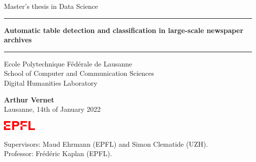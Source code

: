 \documentclass[11pt,preprint]{report}
\begin{document}
\begin{titlepage}
\begin{center}
\hspace{0cm}
\vspace{3cm}

\Large
Master's thesis in Data Science
\vspace{0.25cm}

\rule{\textwidth}{1pt}
\LARGE
\textbf{Automatic table detection and classification in large-scale newspaper archives}
\vspace{0.5cm}
\rule{\textwidth}{1pt}
   
\vspace{0.5cm}

\Large
Ecole Polytechnique Fédérale de Lausanne \\
\vspace{0.2cm}
\large
School of Computer and Communication Sciences\\
\vspace{0.2cm}
\large
Digital Humanities Laboratory \\


\vfill

\LARGE
\textbf{Arthur Vernet} \\
\vspace{0.25cm}
\large
Lausanne, 14th of January 2022
      
\vspace{2.5cm}

\includegraphics[width = 0.125\textwidth]{epfl.png}

\vspace{1.5cm}

\large
Supervisors: Maud Ehrmann (EPFL) and Simon Clematide (UZH).\\
\vspace{0.2cm}
Professor: Frédéric Kaplan (EPFL).
\vspace{1cm}
\end{center}
\end{titlepage}
\end{document}
